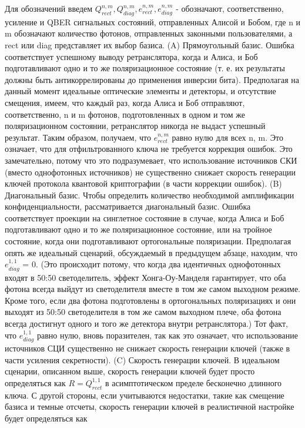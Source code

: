 \newline Для обозначений введем $Q_{rect}^{n,m} , Q_{diag}^{n,m} , e_{rect}^{n,m} , e_{diag}^{n,m}$ - обозначают, соответственно, усиление и QBER сигнальных состояний, отправленных Алисой и Бобом, где n и m обозначают количество фотонов, отправленных законными пользователями, а rect или diag представляет их выбор базиса.
\newline (A) Прямоугольный базис. Ошибка соответствует успешному выводу ретранслятора, когда и Алиса, и Боб подготавливают одно и то же поляризационное состояние (т. е. их результаты должны быть антикоррелированы до применения инверсии бита). Предполагая на данный момент идеальные оптические элементы и детекторы, и отсутствие смещения, имеем, что каждый раз, когда Алиса и Боб отправляют, соответственно, n и m фотонов, подготовленных в одном и том же поляризационном состоянии, ретранслятор никогда не выдаст успешный результат. Таким образом, получаем, что $e_{rect}^{n,m}$
 равно нулю для всех n, m. Это означает, что для отфильтрованного ключа не требуется коррекция ошибок. Это замечательно, потому что это подразумевает, что использование источников СКИ (вместо однофотонных источников) не существенно снижает скорость генерации ключей протокола квантовой криптографии (в части коррекции ошибок).
\newline (B) Диагональный базис. Чтобы определить количество необходимой амплификации конфиденциальности, рассматривается диагональный базис. Ошибка соответствует проекции на синглетное состояние в случае, когда Алиса и Боб подготавливают одно и то же поляризационное состояние, или на тройное состояние, когда они подготавливают ортогональные поляризации. Предполагая опять же идеальный сценарий, обсуждаемый в предыдущем абзаце, находим, что $e_{diag}^{1,1}$ = 0. (Это происходит потому, что когда два идентичных однофотонных входят в 50:50 светоделитель, эффект Хонга-Оу-Манделя \cite{hong1987} гарантирует, что оба фотона всегда выйдут из светоделителя вместе в том же самом выходном режиме. Кроме того, если два фотона подготовлены в ортогональных поляризациях и они выходят из 50:50 светоделителя в том же самом выходном плече, оба фотона всегда достигнут одного и того же детектора внутри ретранслятора.) Тот факт, что $e_{diag}^{1,1}$ равно нулю, вновь поразителен, так как это означает, что использование источников СЦИ существенно не снижает скорость генерации ключей (также в части усиления секретности).
\newline (C) Скорость генерации ключей. В идеальном сценарии, описанном выше, скорость генерации ключей будет просто определяться как $R = Q_{rect}^{1,1}$ в асимптотическом пределе бесконечно длинного ключа. С другой стороны, если учитываются недостатки, такие как смещение базиса и темные отсчеты, скорость генерации ключей в реалистичной настройке будет определяться как
